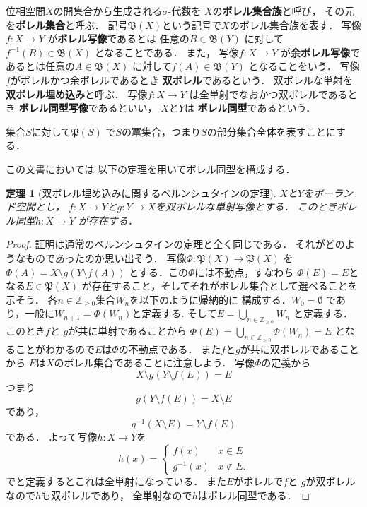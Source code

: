 \documentclass[leqno, 12pt]{jsarticle}
\newtheorem{thm}{定理}
\newcommand{\zz}{\mathbb{Z}}
\newcommand{\mybb}[1]{\mathfrak{B}(#1)}
\newcommand{\mypow}[1]{\mathfrak{P}(#1)}
\begin{document}
位相空間$X$の開集合から生成される$\sigma$-代数を
$X$の\textbf{ボレル集合族}と呼び，
その元を\textbf{ボレル集合}と呼ぶ．
記号$\mybb{X}$という記号で$X$のボレル集合族を表す．
写像$f\colon X\to Y$
が\textbf{ボレル写像}であるとは
任意の$B\in \mybb{Y}$
に対して$f^{-1}(B)\in \mybb{X}$
となることである．
また，
写像$f\colon X\to Y$
が\textbf{余ボレル写像}であるとは任意の$A\in \mybb{X}$
に対して$f(A)\in \mybb{Y}$
となることをいう．
写像$f$がボレルかつ余ボレルであるとき
\textbf{双ボレル}であるという．
双ボレルな単射を\textbf{双ボレル埋め込み}と呼ぶ．
写像$f\colon X\to Y$
は全単射でなおかつ双ボレルであるとき
\textbf{ボレル同型写像}であるといい，
$X$と$Y$は
\textbf{ボレル同型}であるという．

集合$S$に対して$\mypow{S}$
で$S$の冪集合，つまり$S$の部分集合全体を表すことにする．

この文書においては
以下の定理を用いてボレル同型を構成する．
\begin{thm}[双ボレル埋め込みに関するベルンシュタインの定理]\label{thm:bern}
$X$と$Y$をポーランド空間とし，
$f\colon X\to Y$と$g\colon Y\to X$を双ボレルな単射写像とする．
このときボレル同型$h\colon X\to Y$
が存在する．
\end{thm}
\begin{proof}
証明は通常のベルンシュタインの定理と全く同じである．
それがどのようなものであったのか思い出そう．
写像$\Phi\colon \mypow{X}\to \mypow{X}$
を$\Phi(A)=X\setminus g(Y\setminus f(A))$
とする．この$\Phi$には不動点，すなわち
$\Phi(E)=E$となる$E\in \mypow{X}$
が存在すること，そしてそれがボレル集合として選べることを示そう．
各$n\in \zz_{\ge 0}$集合$W_{n}$を以下のように帰納的に
構成する．$W_{0}=\emptyset$
であり，一般に$W_{n+1}=\Phi(W_{n})$と定義する. 
そして$E=\bigcup_{n\in \zz_{\ge 0}}W_{n}$
と定義する．このとき$f$と
$g$が共に単射であることから
$\Phi(E)=\bigcup_{n\in \zz_{\ge 0}}\Phi(W_{n})=E$
となることがわかるので$E$は$\Phi$の不動点である．
また$f$と$g$が共に双ボレルであることから
$E$は$X$のボレル集合であることに注意しよう．
写像$\Phi$の定義から
\[
X\setminus g(Y\setminus f(E))=E
\]つまり
\[
g(Y\setminus f(E))=X\setminus E
\]
であり，
\[
g^{-1}(X\setminus E)=Y\setminus f(E)
\]
である．
よって写像$h\colon X\to Y$を
\[
h(x)=
\begin{cases}
f(x) & \text{$x\in E$}\\
g^{-1}(x) & \text{$x\not \in E$.}
\end{cases}
\]
でと定義するとこれは全単射になっている．
また$E$がボレルで$f$と
$g$が双ボレルなので$h$も双ボレルであり，
全単射なので$h$はボレル同型である．
\end{proof}
\end{document}
